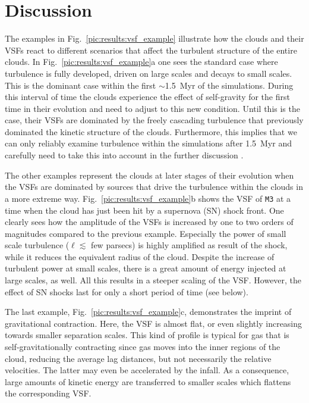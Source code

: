 \section{Discussion}\label{discussion}

The examples in Fig.~\ref{pic:results:vsf_example} illustrate how the clouds and their VSFs react to different scenarios that affect the turbulent structure of the entire clouds. 
In Fig.~\ref{pic:results:vsf_example}a one sees the standard case where turbulence is fully developed, driven on large scales and decays to small scales.
This is the dominant case within the first $\sim$1.5~Myr of the simulations.
During this interval of time the clouds experience the effect of self-gravity for the first time in their evolution and need to adjust to this new condition.
Until this is the case, their VSFs are dominated by the freely cascading turbulence that previously dominated the kinetic structure of the clouds.
Furthermore, this implies that we can only reliably examine turbulence within the simulations after 1.5~Myr and carefully need to take this into account in the further discussion \citep[see][]{IbanezMejia2017,Seifried2017b}.

The other examples represent the clouds at later stages of their evolution when the VSFs are dominated by sources that drive the turbulence within the clouds in a more extreme way.
Fig.~\ref{pic:results:vsf_example}b shows the VSF of \texttt{M3} at a time when the cloud has just been hit by a supernova (SN) shock front. 
One clearly sees how the amplitude of the VSFs is increased by one to two orders of magnitudes compared to the previous example.
Especially the power of small scale turbulence ($\ell \lesssim$ few parsecs) is highly amplified as result of the shock, while it reduces the equivalent radius of the cloud.
Despite the increase of turbulent power at small scales, there is a great amount of energy injected at large scales, as well.
All this results in a steeper scaling of the VSF.
However, the effect of SN shocks last for only a short period of time (see below).

The last example, Fig.~\ref{pic:results:vsf_example}c, demonstrates the imprint of gravitational contraction.
Here, the VSF is almost flat, or even slightly increasing towards smaller separation scales. 
This kind of profile is typical for gas that is self-gravitationally contracting \citep{Boneberg2015,Burkhart2015} since gas moves into the inner regions of the cloud, reducing the average lag distances, but not necessarily the relative velocities.
The latter may even be accelerated by the infall.
As a consequence, large amounts of kinetic energy are transferred to smaller scales which flattens the corresponding VSF.

